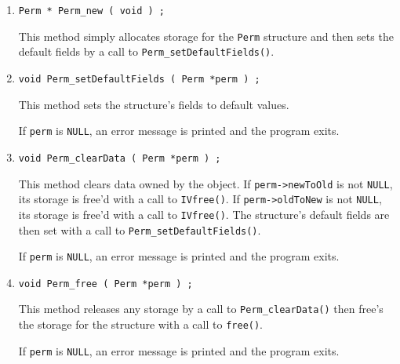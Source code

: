 \begin{enumerate}
\item
\begin{verbatim}
Perm * Perm_new ( void ) ;
\end{verbatim}
This method simply allocates storage for the {\tt Perm} structure 
and then sets the default fields by a call to 
{\tt Perm\_setDefaultFields()}.
\item
\begin{verbatim}
void Perm_setDefaultFields ( Perm *perm ) ;
\end{verbatim}
This method sets the structure's fields to default values.
\par {}
If {\tt perm} is {\tt NULL},
an error message is printed and the program exits.
\item
\begin{verbatim}
void Perm_clearData ( Perm *perm ) ;
\end{verbatim}
This method clears data owned by the object.
If {\tt perm->newToOld} is not {\tt NULL},
its storage is free'd with a call to {\tt IVfree()}.
If {\tt perm->oldToNew} is not {\tt NULL},
its storage is free'd with a call to {\tt IVfree()}.
The structure's default fields are then set
with a call to {\tt Perm\_setDefaultFields()}.
\par {}
If {\tt perm} is {\tt NULL},
an error message is printed and the program exits.
\item
\begin{verbatim}
void Perm_free ( Perm *perm ) ;
\end{verbatim}
This method releases any storage by a call to 
{\tt Perm\_clearData()} then free's the storage for the 
structure with a call to {\tt free()}.
\par {}
If {\tt perm} is {\tt NULL},
an error message is printed and the program exits.
\end{enumerate}
\par
